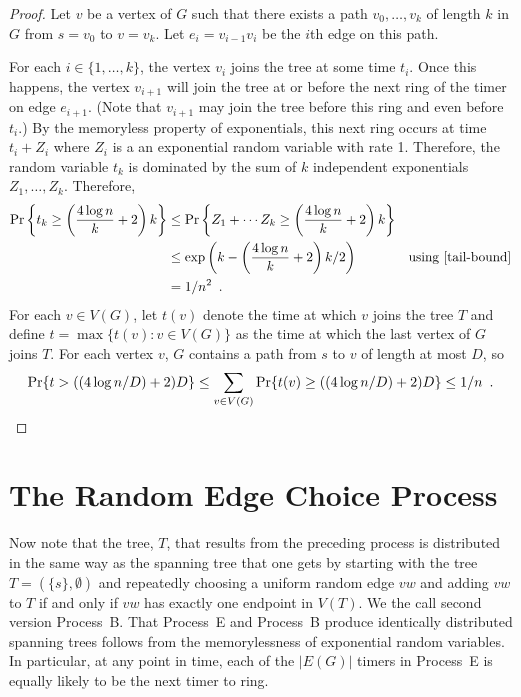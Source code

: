 \documentclass{patmorin}
\begin{document}
\begin{proof}
  Let $v$ be a vertex of $G$ such that there exists a path
  $v_0,\ldots,v_k$ of length $k$ in $G$ from $s=v_0$ to $v=v_k$.
  Let $e_i=v_{i-1}v_i$ be the $i$th edge on this path.

  For each $i\in\{1,\ldots,k\}$, the vertex $v_i$ joins the tree at some
  time $t_i$.  Once this happens, the vertex $v_{i+1}$ will join the tree
  at or before the next ring of the timer on edge $e_{i+1}$.  (Note that
  $v_{i+1}$ may join the tree before this ring and even before $t_i$.)
  By the memoryless property of exponentials, this next ring occurs at
  time $t_i+Z_i$ where $Z_i$ is a an exponential random variable with
  rate 1.  Therefore, the random variable $t_k$ is dominated by the sum
  of $k$ independent exponentials $Z_1,\ldots,Z_k$.  Therefore,
  \begin{align*}
      \Pr\left\{t_k\ge \left(\frac{4\log n}{k}+2\right)k\right\} 
        & \le \Pr\left\{Z_1+\cdots Z_k\ge \left(\frac{4\log n}{k}+2\right)k\right\} \\ 
        & \le \exp\left(k - \left(\frac{4\log n}{k}+2\right)k/2\right) 
            & \text{using \eqref{tail-bound}} \\
      & = 1/n^2 \enspace .
  \end{align*}
  For each $v\in V(G)$, let $t(v)$ denote the time at which $v$ joins
  the tree $T$ and define $t=\max\{t(v):v\in V(G)\}$
  as the time at which the last vertex of $G$ joins 
  $T$.  For each vertex $v$, $G$ contains a path from $s$ to $v$ of length
  at most $D$, so
  \[
      \Pr\{t> ((4\log n/D)+2)D\} \le \sum_{v\in V(G)}\Pr\{t(v) \ge ((4\log n/D)+2)D\}     
       \le 1/n \enspace . \qedhere
  \]
\end{proof}

\section{The Random Edge Choice Process}

Now note that the tree, $T$, that results from the preceding process
is distributed in the same way as the spanning tree that one gets by
starting with the tree $T=(\{s\},\emptyset)$ and repeatedly choosing
a uniform random edge $vw$ and adding $vw$ to $T$ if and only if $vw$
has exactly one endpoint in $V(T)$.  We the call second version Process~B.
That Process~E and Process~B produce identically distributed spanning
trees follows from the memorylessness of exponential random variables.
In particular, at any point in time, each of the $|E(G)|$ timers in
Process~E is equally likely to be the next timer to ring.
\end{document}
